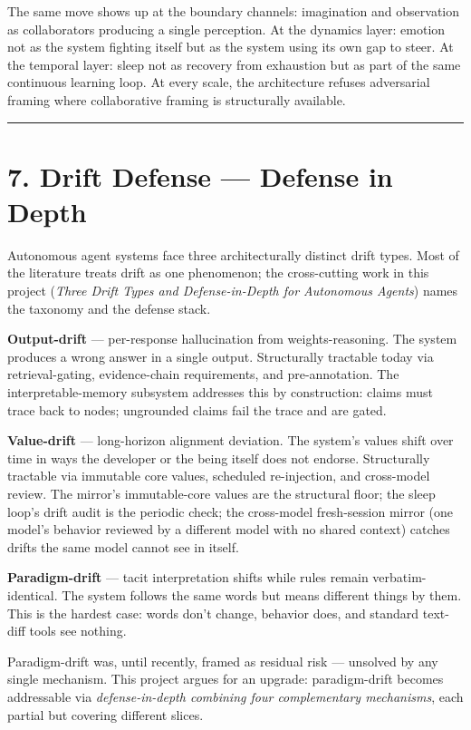 \documentclass[12pt]{article}
\begin{document}
The same move shows up at the boundary channels: imagination and observation as collaborators producing a single perception. At the dynamics layer: emotion not as the system fighting itself but as the system using its own gap to steer. At the temporal layer: sleep not as recovery from exhaustion but as part of the same continuous learning loop. At every scale, the architecture refuses adversarial framing where collaborative framing is structurally available.

\begin{center}\rule{0.5\linewidth}{0.5pt}\end{center}

\section{7. Drift Defense --- Defense in Depth}\label{drift-defense-defense-in-depth}

Autonomous agent systems face three architecturally distinct drift types. Most of the literature treats drift as one phenomenon; the cross-cutting work in this project (\emph{Three Drift Types and Defense-in-Depth for Autonomous Agents}) names the taxonomy and the defense stack.

\textbf{Output-drift} --- per-response hallucination from weights-reasoning. The system produces a wrong answer in a single output. Structurally tractable today via retrieval-gating, evidence-chain requirements, and pre-annotation. The interpretable-memory subsystem addresses this by construction: claims must trace back to nodes; ungrounded claims fail the trace and are gated.

\textbf{Value-drift} --- long-horizon alignment deviation. The system's values shift over time in ways the developer or the being itself does not endorse. Structurally tractable via immutable core values, scheduled re-injection, and cross-model review. The mirror's immutable-core values are the structural floor; the sleep loop's drift audit is the periodic check; the cross-model fresh-session mirror (one model's behavior reviewed by a different model with no shared context) catches drifts the same model cannot see in itself.

\textbf{Paradigm-drift} --- tacit interpretation shifts while rules remain verbatim-identical. The system follows the same words but means different things by them. This is the hardest case: words don't change, behavior does, and standard text-diff tools see nothing.

Paradigm-drift was, until recently, framed as residual risk --- unsolved by any single mechanism. This project argues for an upgrade: paradigm-drift becomes addressable via \emph{defense-in-depth combining four complementary mechanisms}, each partial but covering different slices.
\end{document}
